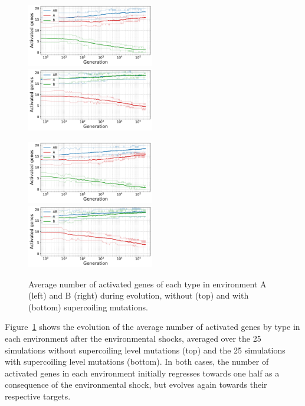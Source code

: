\begin{figure}[H]
\centering
\includegraphics[width=0.495\textwidth]{epistasis/img/control/gene_activity_env_A.pdf}
\includegraphics[width=0.495\textwidth]{epistasis/img/control/gene_activity_env_B.pdf}

\includegraphics[width=0.495\textwidth]{epistasis/img/with-sc/gene_activity_env_A.pdf}
\includegraphics[width=0.495\textwidth]{epistasis/img/with-sc/gene_activity_env_B.pdf}
\caption[Evolution of the number of activated genes in each environment, with a]{Average number of activated genes of each type in environment A (left) and B (right) during evolution, without (top) and with (bottom) supercoiling mutations.}
\label{fig:epistasis:activ-by-env}
\end{figure}

Figure~\ref{fig:epistasis:activ-by-env} shows the evolution of the average number of activated genes by type in each environment after the environmental shocks, averaged over the 25 simulations without supercoiling level mutations (top) and the 25 simulations with supercoiling level mutations (bottom).
In both cases, the number of activated genes in each environment initially regresses towards one half as a consequence of the environmental shock, but evolves again towards their respective targets.

